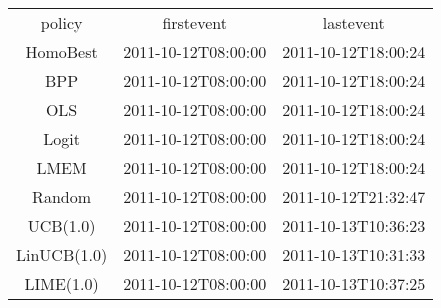 \begin{tabular}{ccc}
policy & firstevent & lastevent\\
HomoBest & 2011-10-12T08:00:00 & 2011-10-12T18:00:24\\
BPP & 2011-10-12T08:00:00 & 2011-10-12T18:00:24\\
OLS & 2011-10-12T08:00:00 & 2011-10-12T18:00:24\\
Logit & 2011-10-12T08:00:00 & 2011-10-12T18:00:24\\
LMEM & 2011-10-12T08:00:00 & 2011-10-12T18:00:24\\
Random & 2011-10-12T08:00:00 & 2011-10-12T21:32:47\\
UCB(1.0) & 2011-10-12T08:00:00 & 2011-10-13T10:36:23\\
LinUCB(1.0) & 2011-10-12T08:00:00 & 2011-10-13T10:31:33\\
LIME(1.0) & 2011-10-12T08:00:00 & 2011-10-13T10:37:25\\
\end{tabular}
